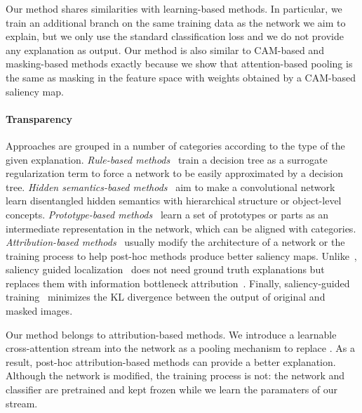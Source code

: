 Our method shares similarities with learning-based methods. In particular, we train an additional branch on the same training data as the network we aim to explain, but we only use the standard classification loss and we do not provide any explanation as output. Our method is also similar to CAM-based and masking-based methods exactly because we show that attention-based pooling is the same as masking in the feature space with weights obtained by a CAM-based saliency map.

\paragraph{Transparency}

Approaches are grouped in a number of categories according to the type of the given explanation. \emph{Rule-based methods}~\citep{wu2018beyond, wu2020regional} train a decision tree as a surrogate regularization term to force a network to be easily approximated by a decision tree.
\emph{Hidden semantics-based methods}~\citep{bau2017network, zhou2018interpreting, zhang2018interpretable, zhou2014object} aim to make a convolutional network learn disentangled hidden semantics with hierarchical structure or object-level concepts.
\emph{Prototype-based methods}~\citep{li2018deep, chen2019looks} learn a set of prototypes or parts as an intermediate representation in the network, which can be aligned with categories. \emph{Attribution-based methods}~\citep{ismail2021improving, Zhou_2022_BMVC, ross2017right, ghaeini2019saliency} usually modify the architecture of a network or the training process to help post-hoc methods produce better saliency maps. Unlike~\citep{ross2017right, ghaeini2019saliency}, saliency guided localization~\citep{Zhou_2022_BMVC} does not need ground truth explanations but replaces them with information bottleneck attribution~\citep{schulz2020restricting}. Finally, saliency-guided training~\citep{ismail2021improving} minimizes the KL divergence between the output of original and masked images.

Our method belongs to attribution-based methods. We introduce a learnable cross-attention stream into the network as a pooling mechanism to replace \gap. As a result, post-hoc attribution-based methods can provide a better explanation. Although the network is modified, the training process is not: the network and classifier are pretrained and kept frozen while we learn the paramaters of our stream.

